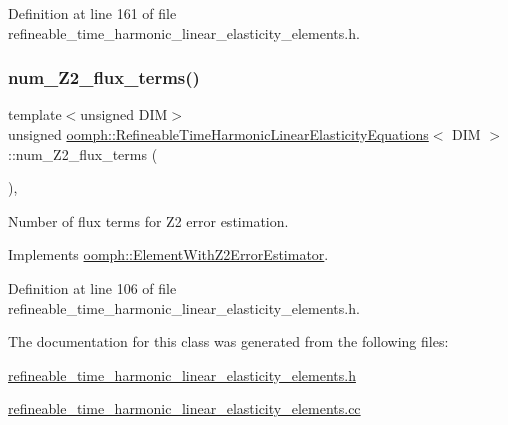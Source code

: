 Definition at line 161 of file refineable\+\_\+time\+\_\+harmonic\+\_\+linear\+\_\+elasticity\+\_\+elements.\+h.

\mbox{\label{classoomph_1_1RefineableTimeHarmonicLinearElasticityEquations_a777cc2db7dc159933afddc073b5f6434}} 
\subsubsection{\texorpdfstring{num\+\_\+\+Z2\+\_\+flux\+\_\+terms()}{num\_Z2\_flux\_terms()}}
{\footnotesize\ttfamily template$<$unsigned D\+IM$>$ \\
unsigned \hyperlink{classoomph_1_1RefineableTimeHarmonicLinearElasticityEquations}{oomph\+::\+Refineable\+Time\+Harmonic\+Linear\+Elasticity\+Equations}$<$ D\+IM $>$\+::num\+\_\+\+Z2\+\_\+flux\+\_\+terms (\begin{DoxyParamCaption}{ }\end{DoxyParamCaption})\hspace{0.3cm}{\ttfamily [inline]}, {\ttfamily [virtual]}}



Number of \textquotesingle{}flux\textquotesingle{} terms for Z2 error estimation. 



Implements \hyperlink{classoomph_1_1ElementWithZ2ErrorEstimator_ae82c5728902e13da31be19c390fc28e3}{oomph\+::\+Element\+With\+Z2\+Error\+Estimator}.



Definition at line 106 of file refineable\+\_\+time\+\_\+harmonic\+\_\+linear\+\_\+elasticity\+\_\+elements.\+h.



The documentation for this class was generated from the following files\+:\begin{DoxyCompactItemize}
\item 
\hyperlink{refineable__time__harmonic__linear__elasticity__elements_8h}{refineable\+\_\+time\+\_\+harmonic\+\_\+linear\+\_\+elasticity\+\_\+elements.\+h}\item 
\hyperlink{refineable__time__harmonic__linear__elasticity__elements_8cc}{refineable\+\_\+time\+\_\+harmonic\+\_\+linear\+\_\+elasticity\+\_\+elements.\+cc}\end{DoxyCompactItemize}
